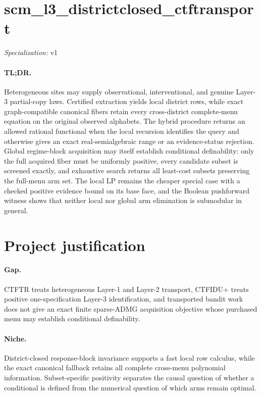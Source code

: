 \documentclass{article}
\begin{document}
\sloppy

\section*{scm\_\allowbreak{}l3\_\allowbreak{}districtclosed\_\allowbreak{}ctftransport}

\noindent\textit{Specialization:} v1\par

\paragraph{TL;DR.} Heterogeneous sites may supply observational, interventional, and genuine Layer-3 partial-copy laws.  Certified extraction yields local district rows, while exact graph-compatible canonical fibers retain every cross-district complete-menu equation on the original observed alphabets.  The hybrid procedure returns an allowed rational functional when the local recursion identifies the query and otherwise gives an exact real-semialgebraic range or an evidence-status rejection.  Global regime-block acquisition may itself establish conditional definability: only the full acquired fiber must be uniformly positive, every candidate subset is screened exactly, and exhaustive search returns all least-cost subsets preserving the full-menu arm set.  The local LP remains the cheaper special case with a checked positive evidence bound on its base face, and the Boolean pushforward witness shows that neither local nor global arm elimination is submodular in general.

\section{Project justification}

\paragraph{Gap.} CTFTR treats heterogeneous Layer-1 and Layer-2 transport, CTFIDU+ treats positive one-specification Layer-3 identification, and transported bandit work does not give an exact finite sparse-ADMG acquisition objective whose purchased menu may establish conditional definability.

\paragraph{Niche.} District-closed response-block invariance supports a fast local row calculus, while the exact canonical fallback retains all complete cross-menu polynomial information.  Subset-specific positivity separates the causal question of whether a conditional is defined from the numerical question of which arms remain optimal.
\end{document}
